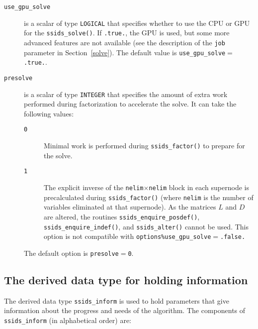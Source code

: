 \documentclass{spral}
\begin{document}

\begin{description}
\item[\texttt{use\_gpu\_solve}] is a scalar of type {\tt LOGICAL} that specifies
   whether to use the CPU or GPU for the \texttt{ssids\_solve()}. If
   \texttt{.true.}, the GPU is used, but some more advanced features are not
   available (see the description of the \texttt{job} parameter in
   Section~\ref{solve}).
   The default value is \texttt{use\_gpu\_solve}$=$\texttt{.true.}.
\item[\texttt{presolve}] is a scalar of type {\tt INTEGER} that specifies the
   amount of extra work performed during factorization to accelerate the solve.
   It can take the following values:
   \begin{description}
      \item[\texttt{0}] Minimal work is performed during {\tt ssids\_factor()}
         to prepare for the solve.
      \item[\texttt{1}] The explicit inverse of the
         \texttt{nelim}$\times$\texttt{nelim} block in each supernode is
         precalculated during {\tt ssids\_factor()} (where \texttt{nelim} is
         the number of variables eliminated at that supernode). As the matrices
         $L$ and $D$ are altered, the routines {\tt ssids\_enquire\_posdef()},
         {\tt ssids\_enquire\_indef()}, and {\tt ssids\_alter()} cannot be used.
         This option is not compatible with {\tt options\%use\_gpu\_solve}$=$\texttt{.false.}
   \end{description}
   The default option is \texttt{presolve}$=$\texttt{0}.
\end{description}


\subsection{The derived data type for holding information}
\label{typeinform}
The derived data type {\tt ssids\_inform}
is used to hold parameters that give information about the progress and needs
of the algorithm. The components of {\tt ssids\_inform}
(in alphabetical order) are:
\end{document}
